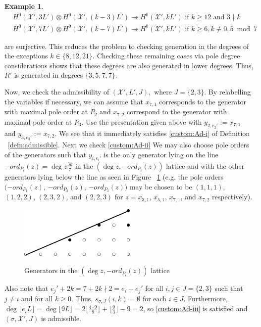 \documentclass{amsart}
\theoremstyle{plain}
\theoremstyle{definition}
\newtheorem{example}[thm]{Example}
\theoremstyle{remark}
\numberwithin{equation}{section}
\newcommand\sx{\mathscr X}
\newcommand{\halfcan}{L}
\begin{document}
\begin{example}
\begin{align*}
	&H^0 (\sx', 3 \halfcan') \otimes H^0 (\sx',
	(k - 3) \halfcan') \rightarrow H^0 (\sx',
	k \halfcan') \text{ if } k \geq 12 \text{ and } 3 \nmid k \\
	&H^0 (\sx', 7 \halfcan') \otimes H^0 (\sx',
	(k - 7) \halfcan') \rightarrow H^0 (\sx',
	k \halfcan') \text{ if } k \geq 6, k \not\equiv 0, 5
	\bmod 7
\end{align*}

\noindent
are surjective. This reduces the problem to checking generation
in the degrees of the exceptions $k \in \{8, 12, 21\}$.
Checking these remaining cases via pole degree considerations shows
that these degrees are also generated in lower degrees. Thus, $R'$
is generated in degrees $\{3, 5, 7, 7\}$.

Now, we check the admissibility of $(\sx', L' ,J),$ where $J = \{2, 3\}$. By relabelling the
variables if necessary, we can assume that $x_{7, 1}$ corresponds
to the generator with maximal pole order at $P_2$ and $x_{7, 2}$
correspond to the generator with maximal pole order at $P_3$. Use
the presentation given above with $y _{2, e_2'} := x_{7, 1}$ and
$y_{3, e_3'} :=  x_{7, 2}$. We see that it immediately satisfies
\ref{custom:Ad-i} of Definition ~\ref{defn:admissible}. Next we check \ref{custom:Ad-ii} We may also choose
pole orders of the generators such that $y_{i, e_i'}$ is the only
generator lying on the line $-ord_{P_i}(z) = \deg z \frac{3k}{7}$
in the $(\deg z, -ord_{P_i}(z))$  lattice and with the other
generators lying below the line as seen in Figure ~\ref{fig:377}
(e.g. the pole orders $(-ord_{P_1}(z)$, $-ord_{P_2}(z)$, $-ord_{P_3}
(z))$ may be chosen to be $(1, 1, 1)$, $(1, 2, 2)$, $(2, 3, 2)$,
and $(2, 2, 3)$ for $z = x_{3, 1}$, $x_{5, 1}$, $x_{7, 1}$, and
$x_{7, 2}$ respectively).

\begin{figure}[H]
\includegraphics{pics/spin-377-pic-pics.pdf} \\
\caption{Generators in the $(\deg z, -ord_{P_i}(z))$ lattice}
\label{fig:377}
\end{figure}

Also note that $e_j' + 2k = 7 + 2k \nmid 2 = e_i - e_j'$ for all
$i, j \in J = \{2, 3\}$ such that $j \neq i$ and for all $k \geq
0$. Thus, $s_{\sigma, J}(i, k) = \emptyset$ for each $i \in J$.
Furthermore, $\deg \lfloor e_i \halfcan \rfloor = \deg \lfloor 9
\halfcan \rfloor = 2 \lfloor \frac{4 \cdot 9}{9} \rfloor + \lfloor
\frac{9}{3} \rfloor - 9 = 2$, so \ref{custom:Ad-iii} is satisfied and
$(\sigma, \sx', J)$ is admissible.


\end{example}
\end{document}
